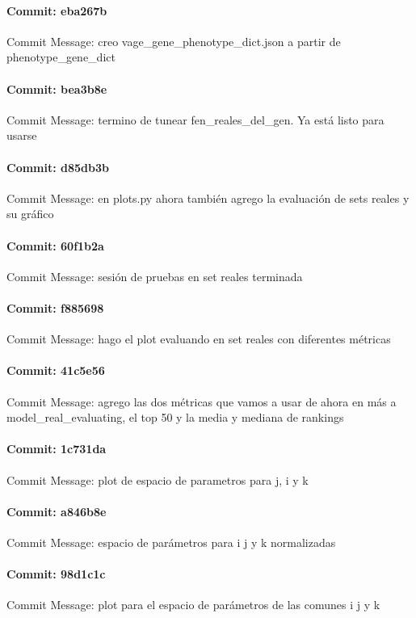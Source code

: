 \documentclass{article}
\begin{document}
\paragraph{Commit: eba267b}
Commit Message: creo vage_gene_phenotype_dict.json a partir de phenotype_gene_dict

\paragraph{Commit: bea3b8e}
Commit Message: termino de tunear fen_reales_del_gen. Ya está listo para usarse

\paragraph{Commit: d85db3b}
Commit Message: en plots.py ahora también agrego la evaluación de sets reales y su gráfico

\paragraph{Commit: 60f1b2a}
Commit Message: sesión de pruebas en set reales terminada

\paragraph{Commit: f885698}
Commit Message: hago el plot evaluando en set reales con diferentes métricas

\paragraph{Commit: 41c5e56}
Commit Message: agrego las dos métricas que vamos a usar de ahora en más a model_real_evaluating, el top 50 y la media y mediana de rankings

\paragraph{Commit: 1c731da}
Commit Message: plot de espacio de parametros para j, i y k

\paragraph{Commit: a846b8e}
Commit Message: espacio de parámetros para i j y k normalizadas

\paragraph{Commit: 98d1c1c}
Commit Message: plot para el espacio de parámetros de las comunes i j y k
\end{document}
